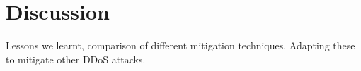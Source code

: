 \section{Discussion}
\label{sec:discussion}

Lessons we learnt, comparison of different mitigation techniques. 
Adapting these to mitigate other DDoS attacks.

